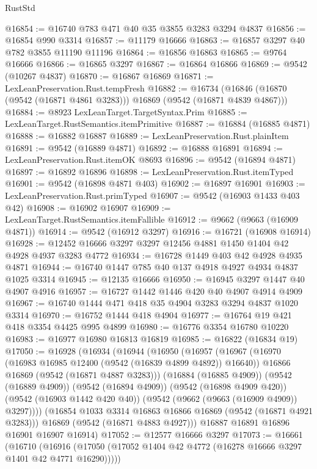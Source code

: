 \begin{lexlean}{RustStd}
\begin{coremodule}
@16854 := @16740 @783 @471 @40 @35 @3855 @3283 @3294 @4837
@16856 := @16854 @990 @3314
@16857 := @11179 @16666
@16863 := @16857 @3297 @40 @782 @3855 @11190 @11196
@16864 := @16856 @16863
@16865 := @9764 @16666
@16866 := @16865 @3297
@16867 := @16864 @16866
@16869 := @9542 (@10267 @4837)
@16870 := @16867 @16869
@16871 := LexLeanPreservation.Rust.tempFresh
@16882 := @16734 (@16846 (@16870 (@9542 (@16871 @4861 @3283))) @16869 (@9542 (@16871 @4839 @4867)))
@16884 := @8923 LexLeanTarget.TargetSyntax.Prim
@16885 := LexLeanTarget.RustSemantics.itemPrimitive
@16887 := @16884 (@16885 @4871)
@16888 := @16882 @16887
@16889 := LexLeanPreservation.Rust.plainItem
@16891 := @9542 (@16889 @4871)
@16892 := @16888 @16891
@16894 := LexLeanPreservation.Rust.itemOK @8693
@16896 := @9542 (@16894 @4871)
@16897 := @16892 @16896
@16898 := LexLeanPreservation.Rust.itemTyped
@16901 := @9542 (@16898 @4871 @403)
@16902 := @16897 @16901
@16903 := LexLeanPreservation.Rust.primTyped
@16907 := @9542 (@16903 @1433 @403 @42)
@16908 := @16902 @16907
@16909 := LexLeanTarget.RustSemantics.itemFallible
@16912 := @9662 (@9663 (@16909 @4871))
@16914 := @9542 (@16912 @3297)
@16916 := @16721 (@16908 @16914)
@16928 := @12452 @16666 @3297 @3297 @12456 @4881 @1450 @1404 @42 @4928 @4937 @3283 @4772
@16934 := @16728 @1449 @403 @42 @4928 @4935 @4871
@16944 := @16740 @1447 @785 @40 @137 @4918 @4927 @4934 @4837 @1025 @3314
@16945 := @12135 @16666
@16950 := @16945 @3297 @1447 @40 @4907 @4916
@16957 := @16727 @1442 @1446 @420 @40 @4907 @4914 @4909
@16967 := @16740 @1444 @471 @418 @35 @4904 @3283 @3294 @4837 @1020 @3314
@16970 := @16752 @1444 @418 @4904
@16977 := @16764 @19 @421 @418 @3354 @4425 @995 @4899
@16980 := @16776 @3354 @16780 @10220
@16983 := @16977 @16980 @16813 @16819
@16985 := @16822 (@16834 @19)
@17050 := @16928
    (@16934
      (@16944
        (@16950
          (@16957
            (@16967
              (@16970 (@16983 @16985 @12400 (@9542 (@16839 @4899 @4892)) @16640))
              @16866
              @16869
              (@9542 (@16871 @4887 @3283)))
            (@16884 (@16885 @4909))
            (@9542 (@16889 @4909))
            (@9542 (@16894 @4909))
            (@9542 (@16898 @4909 @420))
            (@9542 (@16903 @1442 @420 @40))
            (@9542 (@9662 (@9663 (@16909 @4909)) @3297))))
        (@16854 @1033 @3314 @16863 @16866 @16869 (@9542 (@16871 @4921 @3283)))
        @16869
        (@9542 (@16871 @4883 @4927)))
      @16887
      @16891
      @16896
      @16901
      @16907
      @16914)
@17052 := @12577 @16666 @3297
@17073 := @16661
    (@16710 (@16916 (@17050 (@17052 @1404 @42 @4772 (@16278 @16666 @3297 @1401 @42 @4771 @16290)))))

\end{coremodule}
\end{lexlean}
